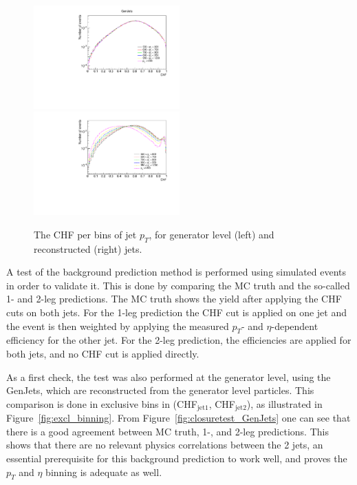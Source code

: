 \begin{figure}[ht]
  \centering
  \includegraphics[width=0.5\textwidth]{figures/ChFPerPtbin_GenJets.pdf}\hfill%
  \includegraphics[width=0.5\textwidth]{figures/ChFperPtbin.pdf}
  \caption{The CHF per bins of jet $p_T$, for generator level (left) and reconstructed (right) jets.}
  \label{fig:pt_dependence}
\end{figure}

A test of the background prediction method is performed using simulated events in order to validate it. This is done by comparing the MC truth and the so-called 1- and 2-leg predictions. The MC truth shows the yield after applying the CHF cuts on both jets. For the 1-leg prediction the CHF cut is applied on one jet and the event is then weighted by applying the measured $p_T$- and $\eta$-dependent efficiency for the other jet. For the 2-leg prediction, the efficiencies are applied for both jets, and no CHF cut is applied directly.

As a first check, the test was also performed at the generator level, using the GenJets, which are reconstructed from the generator level particles. This comparison is done in exclusive bins in (CHF$_{\mathrm{jet 1}}$, CHF$_{\mathrm{jet 2}}$), as illustrated in Figure~\ref{fig:excl_binning}. From Figure~\ref{fig:closuretest_GenJets} one can see that there is a good agreement between MC truth, 1-, and 2-leg predictions. This shows that there are no relevant physics correlations between the 2 jets, an essential prerequisite for this background prediction to work well, and proves the $p_T$ and $\eta$ binning is adequate as well.

